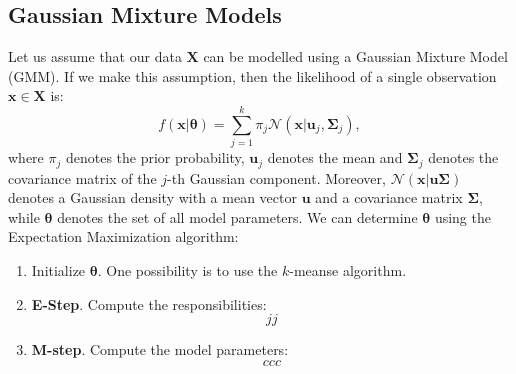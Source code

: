 \documentclass{article}
\begin{document}
\subsection{Gaussian Mixture Models}
Let us assume that our data $\mathbf{X}$ can be modelled using a Gaussian Mixture Model (GMM). If we make this assumption, then the likelihood of a single 
observation $\mathbf{x}\in\mathbf{X}$ is:
\begin{equation}
 f(\mathbf{x}|\mathbf{\theta}) = \sum_{j=1}^k \pi_j \mathcal{N}(\mathbf{x}|\mathbf{u}_j,\mathbf{\Sigma}_j),
\end{equation}
where $\pi_j$ denotes the prior probability, $\mathbf{u}_j$ denotes the mean and $\mathbf{\Sigma}_j$ denotes the covariance matrix of the $j$-th Gaussian component. Moreover,
$\mathcal{N}(\mathbf{x}|\mathbf{u}\mathbf{\Sigma})$ denotes a Gaussian density with a mean vector $\mathbf{u}$ and a covariance matrix $\mathbf{\Sigma}$, while $\mathbf{\theta}$ denotes the set of all model parameters.  
We can determine $\mathbf{\theta}$ using the Expectation Maximization algorithm:
\begin{enumerate}
 \item Initialize $\mathbf{\theta}$. One possibility is to use the $k$-meanse algorithm.
 \item \textbf{E-Step}. Compute the responsibilities:
 \begin{equation}
  jj
 \end{equation}
 \item \textbf{M-step}. Compute the model parameters:
 \begin{equation}
  ccc
 \end{equation}

\end{enumerate}
\end{document}
